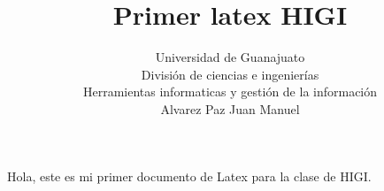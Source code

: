 \documentclass{article}
\title{Primer latex HIGI}
\author{Universidad de Guanajuato\\ División de ciencias e ingenierías\\ Herramientas informaticas y gestión de la información\\ Alvarez Paz Juan Manuel}
\begin{document}
\maketitle





\maketitle{}  
Hola, este es mi primer documento de Latex para la clase de HIGI.
\end{document}
